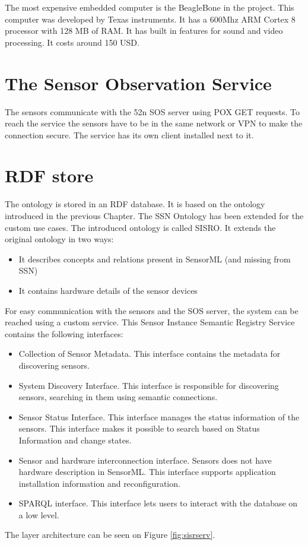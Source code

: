 The most expensive embedded computer is the BeagleBone in the project. This computer was developed by Texas instruments. It has a 600Mhz ARM Cortex 8 processor with 128 MB of RAM. It has built in features for sound and video processing. It costs around 150 USD. 


\section{The Sensor Observation Service}

The sensors communicate with the 52n SOS server using POX GET requests. To reach the service the sensors have to be in the same network or VPN to make the connection secure. The service has its own client installed next to it.

\section{RDF store}

The ontology is stored in an RDF database. It is based on the ontology introduced in the previous Chapter. The SSN Ontology has been extended for the custom use cases. The introduced ontology is called SISRO. It extends the original ontology in two ways:
\begin{itemize}
	\item It describes concepts and relations present in SensorML (and missing from SSN)
	\item It contains hardware details of the sensor devices
\end{itemize}


For easy communication with the sensors and the SOS server, the system can be reached using a custom service.
This Sensor Instance Semantic Registry Service contains the following interfaces:
\begin{itemize}
	\item Collection of Sensor Metadata. This interface contains the metadata for discovering sensors.
	\item System Discovery Interface. This interface is responsible for discovering sensors, searching in them using semantic connections.
	\item Sensor Status Interface. This interface manages the status information of the sensors. This interface makes it possible to search based on Status Information and change states.
	\item Sensor and hardware interconnection interface. Sensors does not have hardware description in SensorML. This interface supports application installation information and reconfiguration.
	\item SPARQL interface. This interface lets users to interact with the database on a low level.	  
\end{itemize}
The layer architecture can be seen on Figure \ref{fig:sisrserv}.	

